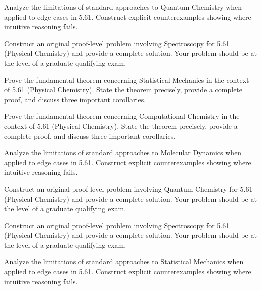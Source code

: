 \documentclass[12pt,a4paper]{exam}
\begin{document}
\begin{questions}

\question[4]
Analyze the limitations of standard approaches to Quantum Chemistry when applied to edge cases in 5.61. Construct explicit counterexamples showing where intuitive reasoning fails.

\vspace{0.3cm}

\question[3]
Construct an original proof-level problem involving Spectroscopy for 5.61 (Physical Chemistry) and provide a complete solution. Your problem should be at the level of a graduate qualifying exam.

\vspace{0.3cm}

\question[4]
Prove the fundamental theorem concerning Statistical Mechanics in the context of 5.61 (Physical Chemistry). State the theorem precisely, provide a complete proof, and discuss three important corollaries.

\vspace{0.3cm}

\question[5]
Prove the fundamental theorem concerning Computational Chemistry in the context of 5.61 (Physical Chemistry). State the theorem precisely, provide a complete proof, and discuss three important corollaries.

\vspace{0.3cm}

\question[4]
Analyze the limitations of standard approaches to Molecular Dynamics when applied to edge cases in 5.61. Construct explicit counterexamples showing where intuitive reasoning fails.

\vspace{0.3cm}

\question[4]
Construct an original proof-level problem involving Quantum Chemistry for 5.61 (Physical Chemistry) and provide a complete solution. Your problem should be at the level of a graduate qualifying exam.

\vspace{0.3cm}

\question[5]
Construct an original proof-level problem involving Spectroscopy for 5.61 (Physical Chemistry) and provide a complete solution. Your problem should be at the level of a graduate qualifying exam.

\vspace{0.3cm}

\question[9]
Analyze the limitations of standard approaches to Statistical Mechanics when applied to edge cases in 5.61. Construct explicit counterexamples showing where intuitive reasoning fails.


\end{questions}
\end{document}
